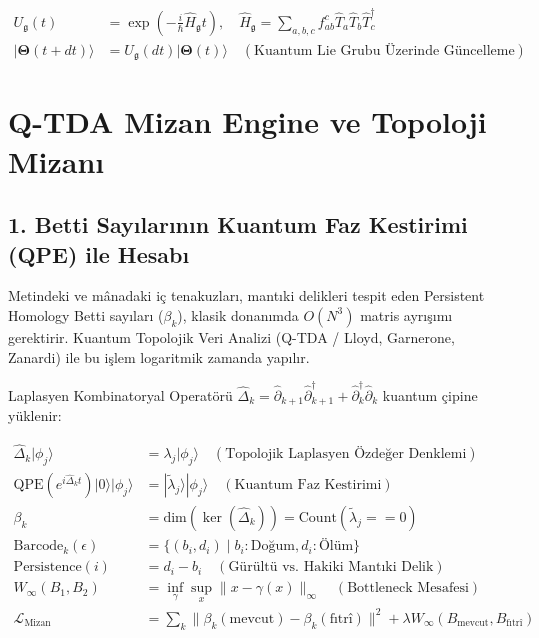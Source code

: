 \documentclass[11pt, a4paper]{article}
\begin{document}
\begin{align}
U_{\mathfrak{g}}(t) &= \exp\left( -\frac{i}{\hbar} \hat{H}_{\mathfrak{g}} t \right), \quad \hat{H}_{\mathfrak{g}} = \sum_{a,b,c} f_{ab}^c \hat{T}_a \hat{T}_b \hat{T}_c^\dagger \\
|\mathbf{\Theta}(t+dt)\rangle &= U_{\mathfrak{g}}(dt) |\mathbf{\Theta}(t)\rangle \quad (\text{Kuantum Lie Grubu Üzerinde Güncelleme})
\end{align}

\section{Q-TDA Mizan Engine ve Topoloji Mizanı}

\subsection{1. Betti Sayılarının Kuantum Faz Kestirimi (QPE) ile Hesabı}
Metindeki ve mânadaki iç tenakuzları, mantıki delikleri tespit eden Persistent Homology Betti sayıları ($\beta_k$), klasik donanımda $O(N^3)$ matris ayrışımı gerektirir. Kuantum Topolojik Veri Analizi (Q-TDA / Lloyd, Garnerone, Zanardi) ile bu işlem logaritmik zamanda yapılır.

Laplasyen Kombinatoryal Operatörü $\hat{\Delta}_k = \hat{\partial}_{k+1} \hat{\partial}_{k+1}^\dagger + \hat{\partial}_k^\dagger \hat{\partial}_k$ kuantum çipine yüklenir:

\begin{align}
\hat{\Delta}_k |\phi_j\rangle &= \lambda_j |\phi_j\rangle \quad (\text{Topolojik Laplasyen Özdeğer Denklemi}) \\
\text{QPE}\left( e^{i \hat{\Delta}_k t} \right) |0\rangle |\phi_j\rangle &= |\tilde{\lambda}_j\rangle |\phi_j\rangle \quad (\text{Kuantum Faz Kestirimi}) \\
\beta_k &= \text{dim}(\ker(\hat{\Delta}_k)) = \text{Count}\left( \tilde{\lambda}_j == 0 \right) \\
\text{Barcode}_k(\epsilon) &= \{ (b_i, d_i) \mid b_i: \text{Doğum}, d_i: \text{Ölüm} \} \\
\text{Persistence}(i) &= d_i - b_i \quad (\text{Gürültü vs. Hakiki Mantıki Delik}) \\
W_\infty(B_1, B_2) &= \inf_\gamma \sup_x \|x - \gamma(x)\|_\infty \quad (\text{Bottleneck Mesafesi}) \\
\mathcal{L}_{\text{Mizan}} &= \sum_k \|\beta_k(\text{mevcut}) - \beta_k(\text{fıtrî})\|^2 + \lambda W_\infty(B_{\text{mevcut}}, B_{\text{fıtrî}})
\end{align}
\end{document}
